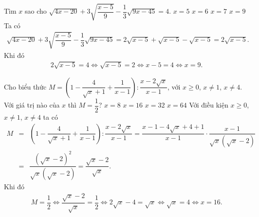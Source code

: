 \begin{bt}
	Tìm $x$ sao cho $\sqrt{4x-20}+3\sqrt{\dfrac{x-5}{9}}-\dfrac{1}{3}\sqrt{9x-45}=4$.
	\choice
	{$x=5$}
	{$x=6$}
	{$x=7$}
	{\True $x=9$}
	\loigiai
	{
		Ta có
		\allowdisplaybreaks
		\begin{eqnarray*}
			\sqrt{4x-20}+3\sqrt{\dfrac{x-5}{9}}-\dfrac{1}{3}\sqrt{9x-45} = 2\sqrt{x-5}+\sqrt{x-5}-\sqrt{x-5}=2\sqrt{x-5}.
		\end{eqnarray*}
		Khi đó
		\begin{eqnarray*}
			2\sqrt{x-5}=4 \Leftrightarrow \sqrt{x-5}=2 \Leftrightarrow x-5=4 \Leftrightarrow x=9.
		\end{eqnarray*}
	}
\end{bt}

\begin{bt}
	Cho biểu thức $M=\left(1-\dfrac{4}{\sqrt{x}+1}+\dfrac{1}{x-1}\right):\dfrac{x-2\sqrt{x}}{x-1}$, với $x\geq 0$, $x\neq 1$, $x \neq 4$. Với giá trị nào của $x$ thì $M=\dfrac{1}{2}$?
	\choice
	{$x=8$}
	{\True $x=16$}
	{$x=32$}
	{$x=64$}
	\loigiai
	{
		Với điều kiện $x\geq 0$, $x\neq 1$, $x \neq 4$ ta có
		\allowdisplaybreaks
		\begin{eqnarray*}
			M&=&\left(1-\dfrac{4}{\sqrt{x}+1}+\dfrac{1}{x-1}\right):\dfrac{x-2\sqrt{x}}{x-1} = \dfrac{x-1-4\sqrt{x}+4+1}{x-1} \cdot \dfrac{x-1}{\sqrt{x}\left(\sqrt{x}-2\right)}\\
			&=& \dfrac{\left(\sqrt{x}-2\right)^2}{\sqrt{x}\left(\sqrt{x}-2\right)} = \dfrac{\sqrt{x}-2}{\sqrt{x}}.
		\end{eqnarray*}
		Khi đó
		\begin{eqnarray*}
			M=\dfrac{1}{2} \Leftrightarrow \dfrac{\sqrt{x}-2}{\sqrt{x}}=\dfrac{1}{2} \Leftrightarrow 2\sqrt{x}-4=\sqrt{x} \Leftrightarrow \sqrt{x}=4 \Leftrightarrow x=16.
		\end{eqnarray*}
	}
\end{bt}